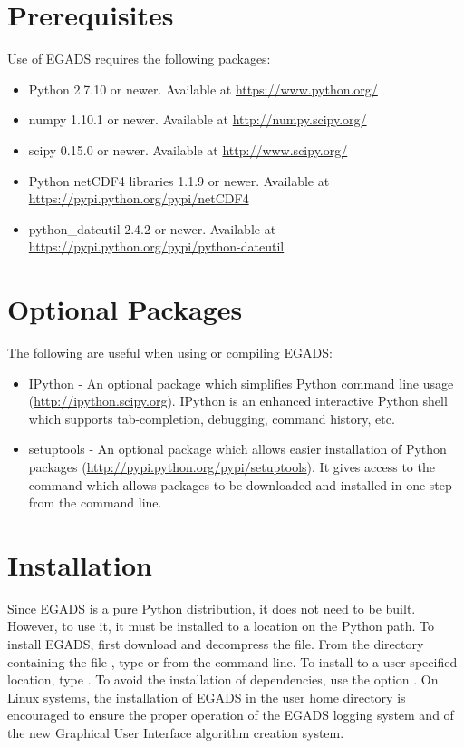 \documentclass[a4paper,10pt,openany,english]{sphinxmanual}
\begin{document}
\section{Prerequisites}
\label{install:prerequisites}
Use of EGADS requires the following packages:
\begin{itemize}
\item {} 
Python 2.7.10 or newer. Available at \url{https://www.python.org/}

\item {} 
numpy 1.10.1 or newer. Available at \url{http://numpy.scipy.org/}

\item {} 
scipy 0.15.0 or newer. Available at \url{http://www.scipy.org/}

\item {} 
Python netCDF4 libraries 1.1.9 or newer. Available at \url{https://pypi.python.org/pypi/netCDF4}

\item {} 
python\_dateutil 2.4.2 or newer. Available at \url{https://pypi.python.org/pypi/python-dateutil}

\end{itemize}


\section{Optional Packages}
\label{install:optional-packages}
The following are useful when using or compiling EGADS:
\begin{itemize}
\item {} 
IPython - An optional package which simplifies Python command line usage (\url{http://ipython.scipy.org}). IPython is an enhanced interactive Python shell which supports tab-completion, debugging, command history, etc.

\item {} 
setuptools - An optional package which allows easier installation of Python packages (\url{http://pypi.python.org/pypi/setuptools}). It gives access to the  command which allows packages to be downloaded and installed in one step from the command line.

\end{itemize}


\section{Installation}
\label{install:id1}
Since EGADS is a pure Python distribution, it does not need to be built. However, to use it, it must be installed to a location on the Python path. To install EGADS, first download and decompress the file. From the directory containing the file , type  or  from the command line. To install to a user-specified location, type . To avoid the installation of dependencies, use the option . On Linux systems, the installation of EGADS in the user home directory is encouraged to ensure the proper operation of the EGADS logging system and of the new Graphical User Interface algorithm creation system.
\end{document}
